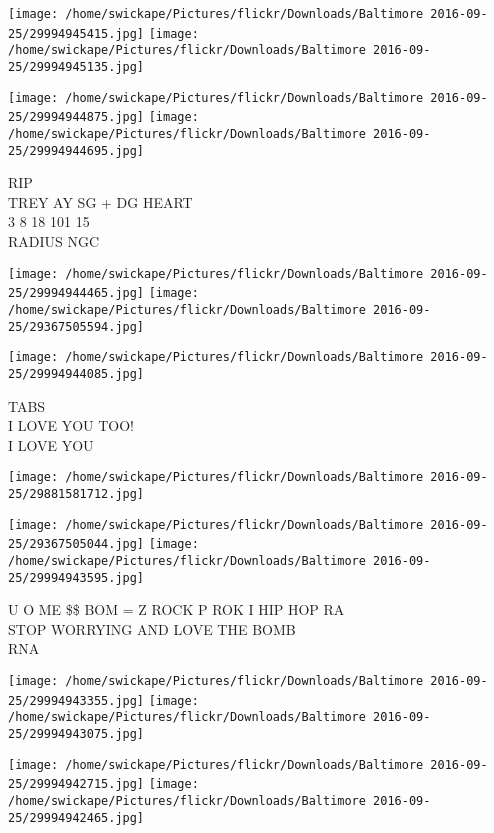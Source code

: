 \documentclass[10pt,letterpaper]{article}
\begin{document}
\texttt{[image: /home/swickape/Pictures/flickr/Downloads/Baltimore 2016-09-25/29994945415.jpg]}
\texttt{[image: /home/swickape/Pictures/flickr/Downloads/Baltimore 2016-09-25/29994945135.jpg]}

\texttt{[image: /home/swickape/Pictures/flickr/Downloads/Baltimore 2016-09-25/29994944875.jpg]}
\texttt{[image: /home/swickape/Pictures/flickr/Downloads/Baltimore 2016-09-25/29994944695.jpg]}

RIP\\
TREY AY SG + DG HEART\\
3 8 18 101 15\\
RADIUS NGC
\pagebreak

\texttt{[image: /home/swickape/Pictures/flickr/Downloads/Baltimore 2016-09-25/29994944465.jpg]}
\texttt{[image: /home/swickape/Pictures/flickr/Downloads/Baltimore 2016-09-25/29367505594.jpg]}

\vspace{0.25in}
\texttt{[image: /home/swickape/Pictures/flickr/Downloads/Baltimore 2016-09-25/29994944085.jpg]}

TABS\\
I LOVE YOU TOO!\\
I LOVE YOU
\pagebreak

\texttt{[image: /home/swickape/Pictures/flickr/Downloads/Baltimore 2016-09-25/29881581712.jpg]}

\vspace{0.25in}
\texttt{[image: /home/swickape/Pictures/flickr/Downloads/Baltimore 2016-09-25/29367505044.jpg]}
\texttt{[image: /home/swickape/Pictures/flickr/Downloads/Baltimore 2016-09-25/29994943595.jpg]}

U O ME \$\$ BOM = Z ROCK P ROK I HIP HOP RA\\
STOP WORRYING AND LOVE THE BOMB\\
RNA
\pagebreak

\texttt{[image: /home/swickape/Pictures/flickr/Downloads/Baltimore 2016-09-25/29994943355.jpg]}
\texttt{[image: /home/swickape/Pictures/flickr/Downloads/Baltimore 2016-09-25/29994943075.jpg]}

\texttt{[image: /home/swickape/Pictures/flickr/Downloads/Baltimore 2016-09-25/29994942715.jpg]}
\texttt{[image: /home/swickape/Pictures/flickr/Downloads/Baltimore 2016-09-25/29994942465.jpg]}
\end{document}

